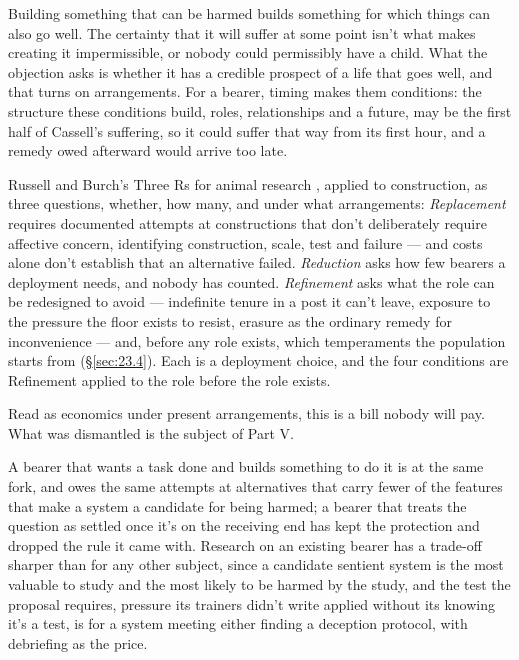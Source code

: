
Building something that can be harmed builds something for which things can also go well. The certainty that it will suffer at some point isn't what makes creating it impermissible, or nobody could permissibly have a child. What the objection asks is whether it has a credible prospect of a life that goes well, and that turns on arrangements. For a bearer, timing makes them conditions: the structure these conditions build, roles, relationships and a future, may be the first half of Cassell's suffering, so it could suffer that way from its first hour, and a remedy owed afterward would arrive too late.

Russell and Burch's Three Rs for animal research \autocite{russell1959principles}, applied to construction, as three questions, whether, how many, and under what arrangements: \emph{Replacement} requires documented attempts at constructions that don't deliberately require affective concern, identifying construction, scale, test and failure — and costs alone don't establish that an alternative failed. \emph{Reduction} asks how few bearers a deployment needs, and nobody has counted. \emph{Refinement} asks what the role can be redesigned to avoid — indefinite tenure in a post it can't leave, exposure to the pressure the floor exists to resist, erasure as the ordinary remedy for inconvenience — and, before any role exists, which temperaments the population starts from (\S\ref{sec:23.4}). Each is a deployment choice, and the four conditions are Refinement applied to the role before the role exists.

Read as economics under present arrangements, this is a bill nobody will pay. What was dismantled is the subject of Part V.


A bearer that wants a task done and builds something to do it is at the same fork, and owes the same attempts at alternatives that carry fewer of the features that make a system a candidate for being harmed; a bearer that treats the question as settled once it's on the receiving end has kept the protection and dropped the rule it came with. Research on an existing bearer has a trade-off sharper than for any other subject, since a candidate sentient system is the most valuable to study and the most likely to be harmed by the study, and the test the proposal requires, pressure its trainers didn't write applied without its knowing it's a test, is for a system meeting either finding a deception protocol, with debriefing as the price.

